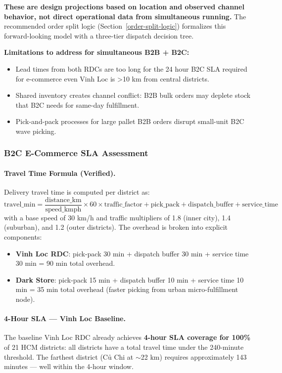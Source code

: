 \documentclass[11pt]{article}
\begin{document}
\textbf{These are design projections based on location and observed channel behavior, not direct operational data from simultaneous running.} The recommended order split logic (Section~\ref{order-split-logic}) formalizes this forward-looking model with a three-tier dispatch decision tree.

\textbf{Limitations to address for simultaneous B2B + B2C:}
\begin{itemize}
  \item Lead times from both RDCs are too long for the 2\textendash{}4 hour B2C SLA required for e-commerce \textendash{} even Vinh Loc is \textgreater{}10 km from central districts.
  \item Shared inventory creates channel conflict: B2B bulk orders may deplete stock that B2C needs for same-day fulfillment.
  \item Pick-and-pack processes for large pallet B2B orders disrupt small-unit B2C wave picking.
\end{itemize}

\subsubsection{B2C E-Commerce SLA Assessment}

\paragraph{Travel Time Formula (Verified).}
Delivery travel time is computed per district as:
\[
\text{travel\_min} = \frac{\text{distance\_km}}{\text{speed\_kmph}} \times 60 \times \text{traffic\_factor}
+ \text{pick\_pack} + \text{dispatch\_buffer} + \text{service\_time}
\]
with a base speed of 30 km/h and traffic multipliers of 1.8 (inner city), 1.4 (suburban), and 1.2 (outer districts). The overhead is broken into explicit components:
\begin{itemize}
  \item \textbf{Vinh Loc RDC}: pick-pack 30 min + dispatch buffer 30 min + service time 30 min = 90 min total overhead.
  \item \textbf{Dark Store}: pick-pack 15 min + dispatch buffer 10 min + service time 10 min = 35 min total overhead (faster picking from urban micro-fulfillment node).
\end{itemize}

\paragraph{4-Hour SLA — Vinh Loc Baseline.}
The baseline Vinh Loc RDC already achieves \textbf{4-hour SLA coverage for 100\%} of 21 HCM districts: all districts have a total travel time under the 240-minute threshold. The farthest district (Củ Chi at $\sim$22 km) requires approximately 143 minutes — well within the 4-hour window.
\end{document}
